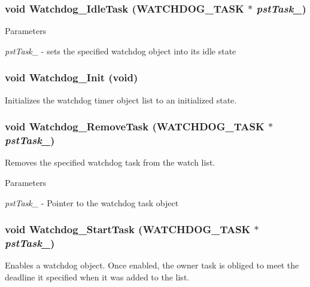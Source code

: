 \subsubsection[{Watchdog\_\-IdleTask}]{\setlength{\rightskip}{0pt plus 5cm}void Watchdog\_\-IdleTask ({\bf WATCHDOG\_\-TASK} $\ast$ {\em pstTask\_\-})}\label{watchdog_8h_a48cdfb15edeb242c57c6776e641b78ae}

\begin{DoxyParams}{Parameters}
\item[{\em pstTask\_\-}]-\/ sets the specified watchdog object into its idle state \end{DoxyParams}
\subsubsection[{Watchdog\_\-Init}]{\setlength{\rightskip}{0pt plus 5cm}void Watchdog\_\-Init (void)}\label{watchdog_8h_a495a07bd1939981855363ee899e619ed}
Initializes the watchdog timer object list to an initialized state. 
\subsubsection[{Watchdog\_\-RemoveTask}]{\setlength{\rightskip}{0pt plus 5cm}void Watchdog\_\-RemoveTask ({\bf WATCHDOG\_\-TASK} $\ast$ {\em pstTask\_\-})}\label{watchdog_8h_a8c02f00df13f4cee94781679638b82e7}
Removes the specified watchdog task from the watch list.


\begin{DoxyParams}{Parameters}
\item[{\em pstTask\_\-}]-\/ Pointer to the watchdog task object \end{DoxyParams}
\subsubsection[{Watchdog\_\-StartTask}]{\setlength{\rightskip}{0pt plus 5cm}void Watchdog\_\-StartTask ({\bf WATCHDOG\_\-TASK} $\ast$ {\em pstTask\_\-})}\label{watchdog_8h_ad92eafd2e2e876c85cdd6bcf755e8efb}
Enables a watchdog object. Once enabled, the owner task is obliged to meet the deadline it specified when it was added to the list.


